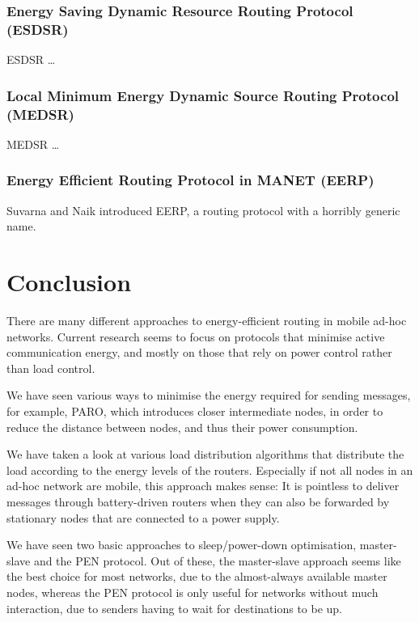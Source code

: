 \documentclass[conference]{IEEEtran}
\begin{document}
\subsubsection{Energy Saving Dynamic Resource Routing Protocol (ESDSR)}
ESDSR\cite{tarique2005energy} \ldots
\subsubsection{Local Minimum Energy Dynamic Source Routing Protocol (MEDSR)}
MEDSR\cite{tanque2007minimum} \ldots

\subsubsection{Energy Efficient Routing Protocol in MANET (EERP)}
Suvarna and Naik introduced EERP, a routing protocol with a horribly
generic name\cite{main2}.

\section{Conclusion}
There are many different approaches to energy-efficient routing in
mobile ad-hoc networks. Current research seems to focus on protocols
that minimise active communication energy, and mostly on those that
rely on power control rather than load control.

We have seen various ways to minimise the energy required for sending
messages, for example, PARO, which introduces closer intermediate nodes,
in order to reduce the distance between nodes, and thus their
power consumption.

We have taken a look at various load distribution algorithms that distribute
the load according to the energy levels of the routers. Especially if not all
nodes in an ad-hoc network are mobile, this approach makes sense: It is
pointless to deliver messages through battery-driven routers when they can
also be forwarded by stationary nodes that are connected to a power supply.

We have seen two basic approaches to sleep/power-down optimisation, master-slave
and the PEN protocol. Out of these, the master-slave approach seems like the
best choice for most networks, due to the almost-always available master nodes,
whereas the PEN protocol is only useful for networks without much interaction,
due to senders having to wait for destinations to be up.




\end{document}
